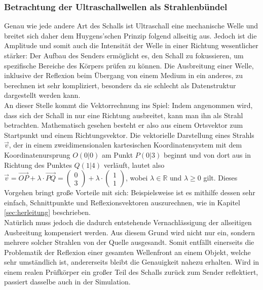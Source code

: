 \documentclass[reducespace,stylepage,semiarbeit]{spezidoc}
\newcommand{\vect}[2]{\begin{pmatrix}#1\\#2\end{pmatrix}}
\begin{document}
\subsubsection{Betrachtung der Ultraschallwellen als Strahlenbündel}
Genau wie jede andere Art des Schalls ist Ultraschall eine mechanische Welle und breitet sich daher dem Huygens'schen Prinzip folgend allseitig aus. 
Jedoch ist die Amplitude und somit auch die Intensität der Welle in einer Richtung wesentlicher stärker: Der Aufbau des Senders ermöglicht es, den Schall zu fokussieren, um spezifische Bereiche des Körpers prüfen zu können.
Die Ausbreitung einer Welle, inklusive der Reflexion beim Übergang von einem Medium in ein anderes, zu berechnen ist sehr kompliziert, besonders da sie schlecht als Datenstruktur dargestellt werden kann.\\
An dieser Stelle kommt die Vektorrechnung ins Spiel: Indem angenommen wird, dass sich der Schall in nur eine Richtung ausbreitet, kann man ihn als Strahl betrachten. 
Mathematisch gesehen besteht er also aus einem Ortsvektor zum Startpunkt und einem Richtungsvektor. 
Die vektorielle Darstellung eines Strahls $\vec{v}$, der in einem zweidimensionalen kartesischen Koordinatensystem mit dem Koordinatenursprung $O(0|0)$ am Punkt $P(0|3)$ beginnt und von dort aus in Richtung des Punktes $Q(1|4)$ verläuft, lautet also $\vec{v} = \overrightarrow{OP} + \lambda \cdot \overrightarrow{PQ} = \vect{0}{3} + \lambda \cdot \vect{1}{1}$, wobei $\lambda\in\mathbb{R}$ und $\lambda\geq0$ gilt. 
Dieses Vorgehen bringt große Vorteile mit sich: Beispielsweise ist es mithilfe dessen sehr einfach, Schnittpunkte und Reflexionsvektoren auszurechnen, wie in Kapitel \ref{sec:herleitung} beschrieben.\\
Natürlich muss jedoch die dadurch entstehende Vernachlässigung der allseitigen Ausbreitung kompensiert werden. 
Aus diesem Grund wird nicht nur ein, sondern mehrere solcher Strahlen von der Quelle ausgesandt. 
Somit entfällt einerseits die Problematik der Reflexion einer gesamten Wellenfront an einem Objekt, welche sehr umständlich ist, andererseits bleibt die Genauigkeit nahezu erhalten. 
Wird in einem realen Prüfkörper ein großer Teil des Schalls zurück zum Sender reflektiert, passiert dasselbe auch in der Simulation. 
\end{document}
